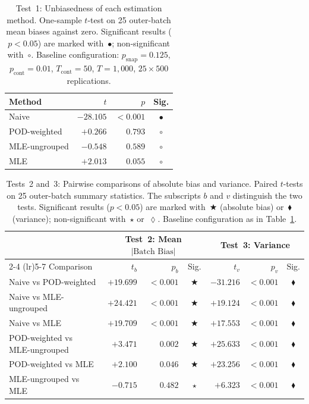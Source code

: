 \documentclass[11pt]{article}
\begin{document}
\begin{table}[htbp]
\centering
\caption{Test~1: Unbiasedness of each estimation method. One-sample $t$-test on 25 outer-batch mean biases against zero. Significant results ($p < 0.05$) are marked with~$\bullet$; non-significant with~$\circ$. Baseline configuration: $p_{\text{snap}}=0.125$, $p_{\text{cont}}=0.01$, $T_{\text{cont}}=50$, $T=1{,}000$, $25 \times 500$ replications.}
\label{tab:unbiasedness}
\small
\vspace{6pt}
\begin{tabular}{l r r c}
\toprule
Method & $t$ & $p$ & Sig. \\
\midrule
Naive & $-28.105$ & $<0.001$ & $\bullet$ \\
POD-weighted & $+0.266$ & $0.793$ & $\circ$ \\
MLE-ungrouped & $-0.548$ & $0.589$ & $\circ$ \\
MLE & $+2.013$ & $0.055$ & $\circ$ \\
\bottomrule
\end{tabular}
\end{table}

\begin{table}[htbp]
\centering
\caption{Tests~2 and~3: Pairwise comparisons of absolute bias and variance. Paired $t$-tests on 25 outer-batch summary statistics. The subscripts $b$ and $v$ distinguish the two tests. Significant results ($p < 0.05$) are marked with~$\bigstar$ (absolute bias) or~$\blacklozenge$ (variance); non-significant with~$\star$ or~$\lozenge$. Baseline configuration as in Table~\ref{tab:unbiasedness}.}
\label{tab:pairwise_tests}
\small
\vspace{6pt}
\begin{tabular}{l rr c rr c}
\toprule
 & \multicolumn{3}{c}{Test~2: Mean $|\text{Batch Bias}|$} & \multicolumn{3}{c}{Test~3: Variance} \\
\cmidrule(lr){2-4} \cmidrule(lr){5-7}
Comparison & $t_b$ & $p_b$ & Sig. & $t_v$ & $p_v$ & Sig. \\
\midrule
Naive vs POD-weighted & $+19.699$ & $<0.001$ & $\bigstar$ & $-31.216$ & $<0.001$ & $\blacklozenge$ \\
Naive vs MLE-ungrouped & $+24.421$ & $<0.001$ & $\bigstar$ & $+19.124$ & $<0.001$ & $\blacklozenge$ \\
Naive vs MLE & $+19.709$ & $<0.001$ & $\bigstar$ & $+17.553$ & $<0.001$ & $\blacklozenge$ \\
POD-weighted vs MLE-ungrouped & $+3.471$ & $0.002$ & $\bigstar$ & $+25.633$ & $<0.001$ & $\blacklozenge$ \\
POD-weighted vs MLE & $+2.100$ & $0.046$ & $\bigstar$ & $+23.256$ & $<0.001$ & $\blacklozenge$ \\
MLE-ungrouped vs MLE & $-0.715$ & $0.482$ & $\star$ & $+6.323$ & $<0.001$ & $\blacklozenge$ \\
\bottomrule
\end{tabular}
\end{table}
\end{document}
